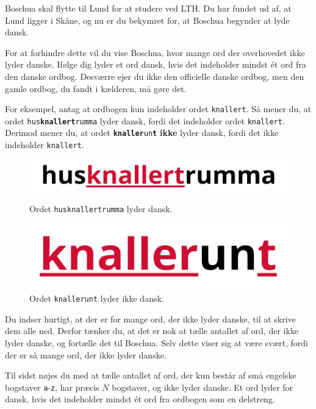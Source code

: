 
\noindent
Boschua skal flytte til Lund for at studere ved LTH. 
Du har fundet ud af, at Lund ligger i Skåne, og nu er du bekymret for, at Boschua begynder at lyde dansk.

For at forhindre dette vil du vise Boschua, hvor mange ord der overhovedet ikke lyder danske. 
Ifølge dig lyder et ord dansk, hvis det indeholder mindst ét ord fra den danske ordbog. 
Desværre ejer du ikke den officielle danske ordbog, men den gamle ordbog, du fandt i kælderen, må gøre det.

For eksempel, antag at ordbogen kun indeholder ordet \texttt{knallert}. Så mener du, at ordet \texttt{hus\textbf{knallert}rumma} 
lyder dansk, fordi det indeholder ordet \texttt{knallert}. Derimod mener du, at ordet \texttt{\textbf{knaller}un\textbf{t}} \textbf{ikke} 
lyder dansk, fordi det ikke indeholder \texttt{knallert}.

\begin{figure}[h]
  \centering
  \begin{minipage}{0.45\textwidth}
    \centering
    \includegraphics[scale=0.7]{danska-knallert.png}
    \caption{Ordet \texttt{husknallertrumma} lyder dansk.}
  \end{minipage}\hfill
  \begin{minipage}{0.45\textwidth}
    \centering
    \includegraphics[scale=0.7]{knallerunt.png}
    \caption{Ordet \texttt{knallerunt} lyder ikke dansk.}
  \end{minipage}
\end{figure}

Du indser hurtigt, at der er for mange ord, der ikke lyder danske, til at skrive dem alle ned. 
Derfor tænker du, at det er nok at tælle antallet af ord, der ikke lyder danske, og fortælle det til Boschua. 
Selv dette viser sig at være svært, fordi der er så mange ord, der ikke lyder danske.

Til sidst nøjes du med at tælle antallet af ord, der kun består af små engelske bogstaver 
\texttt{a}-\texttt{z}, har præcis $N$ bogstaver, og ikke lyder danske. Et ord lyder for dansk, hvis det indeholder 
mindst ét ord fra ordbogen som en delstreng.

